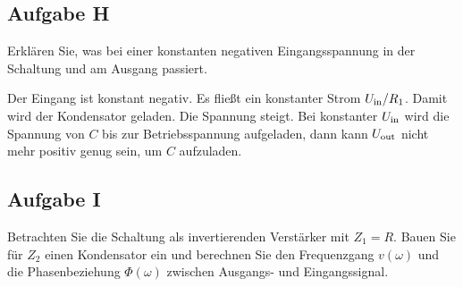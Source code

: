 \subsection{Aufgabe H}

\begin{problem}
	Erklären Sie, was bei einer konstanten negativen Eingangsspannung in der
	Schaltung und am Ausgang passiert.
\end{problem}

Der Eingang ist konstant negativ. Es fließt ein konstanter Strom $U_\text{in}/R_1$.
Damit wird der Kondensator geladen. Die Spannung steigt. Bei konstanter $U_\text{in}$
wird die Spannung von $C$ bis zur Betriebsspannung aufgeladen, dann kann
$U_\text{out}$ nicht mehr positiv genug sein, um $C$ aufzuladen.

\subsection{Aufgabe I}

\begin{problem}
	Betrachten Sie die Schaltung als invertierenden Verstärker mit $Z_1 = R$.
	Bauen Sie für $Z_2$ einen Kondensator ein und berechnen Sie den
	Frequenzgang $v(\omega)$ und die Phasenbeziehung $\Phi(\omega)$ zwischen
	Ausgangs- und Eingangssignal.
\end{problem}


\FloatBarrier
\IfFileExists{\bibliographyfile}{
	
}{}



